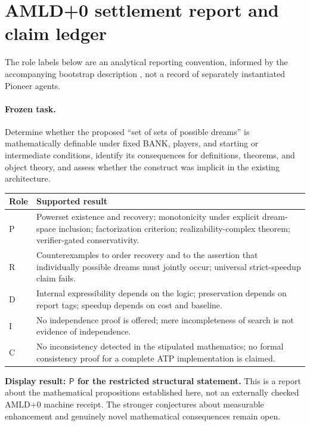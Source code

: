 \documentclass[11pt,letterpaper]{article}
\theoremstyle{definition}
\theoremstyle{remark}
\newcommand{\status}[1]{\textsf{#1}}
\begin{document}
\section{AMLD+0 settlement report and claim ledger}
\noindent The role labels below are an analytical reporting convention, informed by the accompanying bootstrap description \cite{tenneson-bootstrap}, not a record of separately instantiated Pioneer agents.
\paragraph{Frozen task.} Determine whether the proposed ``set of sets of possible dreams'' is mathematically definable under fixed BANK, players, and starting or intermediate conditions, identify its consequences for definitions, theorems, and object theory, and assess whether the construct was implicit in the existing architecture.

\begin{center}
\small
\renewcommand{\arraystretch}{1.17}
\begin{tabularx}{\textwidth}{@{}p{}X@{}}
\toprule
Role & Supported result \\
\midrule
\status{P} & Powerset existence and recovery; monotonicity under explicit dream-space inclusion; factorization criterion; realizability-complex theorem; verifier-gated conservativity. \\
\status{R} & Counterexamples to order recovery and to the assertion that individually possible dreams must jointly occur; universal strict-speedup claim fails. \\
\status{D} & Internal expressibility depends on the logic; preservation depends on report tags; speedup depends on cost and baseline. \\
\status{I} & No independence proof is offered; mere incompleteness of search is not evidence of independence. \\
\status{C} & No inconsistency detected in the stipulated mathematics; no formal consistency proof for a complete ATP implementation is claimed. \\
\bottomrule
\end{tabularx}
\end{center}

\noindent\textbf{Display result: $\status{P}$ for the restricted structural statement.} This is a report about the mathematical propositions established here, not an externally checked AMLD+0 machine receipt. The stronger conjectures about measurable enhancement and genuinely novel mathematical consequences remain open.
\end{document}
